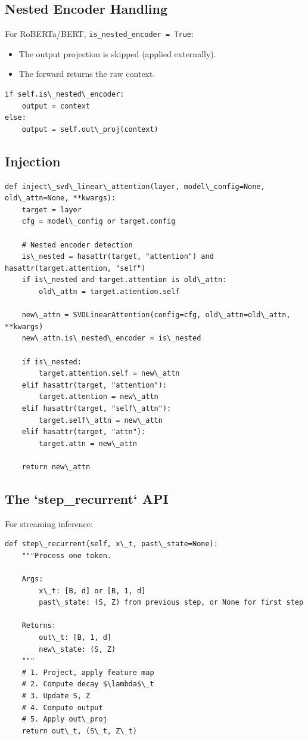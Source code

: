 \subsection{Nested Encoder Handling}

For RoBERTa/BERT, \texttt{is\_nested\_encoder = True}:
\begin{itemize}
\item The output projection is skipped (applied externally).
\item The forward returns the raw context.

\end{itemize}
\begin{lstlisting}
if self.is\_nested\_encoder:
    output = context
else:
    output = self.out\_proj(context)
\end{lstlisting}

\subsection{Injection}

\begin{lstlisting}
def inject\_svd\_linear\_attention(layer, model\_config=None, old\_attn=None, **kwargs):
    target = layer
    cfg = model\_config or target.config
    
    # Nested encoder detection
    is\_nested = hasattr(target, "attention") and hasattr(target.attention, "self")
    if is\_nested and target.attention is old\_attn:
        old\_attn = target.attention.self
    
    new\_attn = SVDLinearAttention(config=cfg, old\_attn=old\_attn, **kwargs)
    new\_attn.is\_nested\_encoder = is\_nested
    
    if is\_nested:
        target.attention.self = new\_attn
    elif hasattr(target, "attention"):
        target.attention = new\_attn
    elif hasattr(target, "self\_attn"):
        target.self\_attn = new\_attn
    elif hasattr(target, "attn"):
        target.attn = new\_attn
    
    return new\_attn
\end{lstlisting}

\subsection{The `step\_recurrent` API}

For streaming inference:

\begin{lstlisting}
def step\_recurrent(self, x\_t, past\_state=None):
    """Process one token.
    
    Args:
        x\_t: [B, d] or [B, 1, d]
        past\_state: (S, Z) from previous step, or None for first step
    
    Returns:
        out\_t: [B, 1, d]
        new\_state: (S, Z)
    """
    # 1. Project, apply feature map
    # 2. Compute decay $\lambda$\_t
    # 3. Update S, Z
    # 4. Compute output
    # 5. Apply out\_proj
    return out\_t, (S\_t, Z\_t)
\end{lstlisting}

